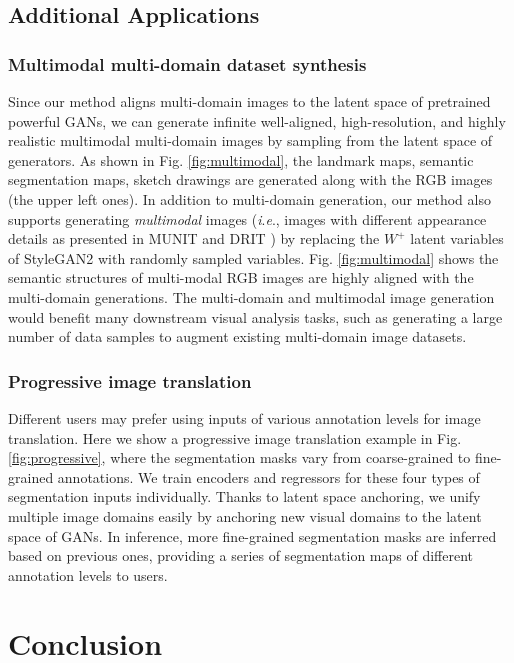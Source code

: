 \documentclass[10pt,journal,compsoc]{IEEEtran}
\newcommand{\ie}{\textit{i}.\textit{e}.}
\begin{document}
{\subsection{Additional Applications}

\subsubsection{Multimodal multi-domain dataset synthesis} 
Since our method aligns multi-domain images to the latent space of pretrained powerful GANs, we can generate infinite well-aligned, high-resolution, and highly realistic multimodal multi-domain images by sampling from the latent space of generators. As shown in Fig. \ref{fig:multimodal}, the landmark maps, semantic segmentation maps, sketch drawings are generated along with the RGB images (the upper left ones). In addition to multi-domain generation, our method also supports generating \emph{multimodal} images (\ie, images with different appearance details as presented in MUNIT \cite{munit} and DRIT \cite{drit}) by replacing the $W^+$ latent variables of StyleGAN2 \cite{stylegan2} with randomly sampled variables. Fig. \ref{fig:multimodal} shows the semantic structures of multi-modal RGB images are highly aligned with the multi-domain generations. The multi-domain and multimodal image generation would benefit many downstream visual analysis tasks, such as generating a large number of data samples to augment existing multi-domain image datasets. 

\subsubsection{Progressive image translation} Different users may prefer using inputs of various annotation levels for image translation. Here we show a progressive image translation example in Fig. \ref{fig:progressive}, where the segmentation masks vary from coarse-grained to fine-grained annotations. We train encoders and regressors for these four types of segmentation inputs individually. Thanks to latent space anchoring, we unify multiple image domains easily by anchoring new visual domains to the latent space of GANs. In inference, more fine-grained segmentation masks are inferred based on previous ones, providing a series of segmentation maps of different annotation levels to users. 

\section{Conclusion}

}
\end{document}

